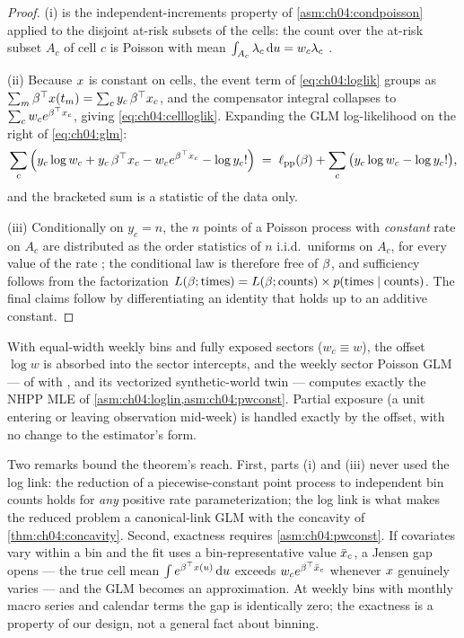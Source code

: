 \begin{proof}
(i) is the independent-increments property of
\cref{asm:ch04:condpoisson} applied to the disjoint at-risk subsets of the
cells: the count over the at-risk subset $A_c$ of cell $c$ is Poisson with
mean $\int_{A_c} \lambda_c \,\mathrm{d} u = w_c \lambda_c$
\citep{kingman1993}.

(ii) Because $x$ is constant on cells, the event term of
\cref{eq:ch04:loglik} groups as $\sum_m \beta^{\top}x(t_m) = \sum_c y_c\,
\beta^{\top}x_c$, and the compensator integral collapses to $\sum_c w_c
e^{\beta^{\top}x_c}$, giving \cref{eq:ch04:cellloglik}. Expanding the GLM
log-likelihood on the right of \cref{eq:ch04:glm}:
\[
\sum_c \Big( y_c \log w_c + y_c\,\beta^{\top}x_c
 - w_c e^{\beta^{\top}x_c} - \log y_c! \Big)
 \;=\;
\ell_{\mathrm{pp}}(\beta)
 + \sum_c \big( y_c \log w_c - \log y_c! \big),
\]
and the bracketed sum is a statistic of the data only.

(iii) Conditionally on $y_c = n$, the $n$ points of a Poisson process with
\emph{constant} rate on $A_c$ are distributed as the order statistics of
$n$ i.i.d.\ uniforms on $A_c$, for every value of the rate
\citep{kingman1993}; the conditional law is therefore free of $\beta$,
and sufficiency follows from the factorization
$L(\beta; \text{times}) = L(\beta; \text{counts}) \times
p(\text{times} \mid \text{counts})$. The final claims follow by
differentiating an identity that holds up to an additive constant.
\end{proof}

\begin{corollary}\label{cor:ch04:repoglm}
With equal-width weekly bins and fully exposed sectors ($w_c \equiv w$),
the offset $\log w$ is absorbed into the sector intercepts, and the weekly
sector Poisson GLM ---  of
 with , and its vectorized
synthetic-world twin  --- computes
exactly the NHPP MLE of
\cref{asm:ch04:loglin,asm:ch04:pwconst}. Partial exposure (a unit entering
or leaving observation mid-week) is handled exactly by the offset, with no
change to the estimator's form.
\end{corollary}

Two remarks bound the theorem's reach. First, parts (i) and (iii) never
used the log link: the reduction of a piecewise-constant point process to
independent bin counts holds for \emph{any} positive rate
parameterization; the log link is what makes the reduced problem a
canonical-link GLM with the concavity of \cref{thm:ch04:concavity}.
Second, exactness requires \cref{asm:ch04:pwconst}. If covariates vary
within a bin and the fit uses a bin-representative value $\bar{x}_c$, a
Jensen gap opens --- the true cell mean $\int e^{\beta^{\top}x(u)}\,\mathrm{d} u$
exceeds $w_c e^{\beta^{\top}\bar{x}_c}$ whenever $x$ genuinely varies
--- and the GLM becomes an approximation. At weekly bins with monthly
macro series and calendar terms the gap is identically zero; the exactness
is a property of our design, not a general fact about binning.

